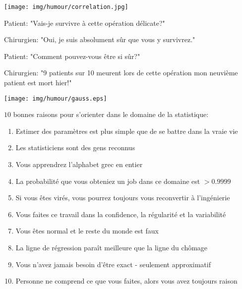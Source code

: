 \begin{center}\underline{\hspace{5 cm}}\end{center}

	\begin{center}
	\texttt{[image: img/humour/correlation.jpg]}
	\end{center}

\begin{center}\underline{\hspace{5 cm}}\end{center}

Patient: "Vais-je survivre à cette opération délicate?"

Chirurgien: "Oui, je suis absolument sûr que vous y survivrez."

Patient: "Comment pouvez-vous être si sûr?"

Chirurgien: "9 patients sur 10 meurent lors de cette opération mon neuvième patient est mort hier!"

\begin{center}\underline{\hspace{5 cm}}\end{center}

	\begin{center}
	\texttt{[image: img/humour/gauss.eps]}
	\end{center}

\pagebreak
$10$ bonnes raisons pour s'orienter dans le domaine de la statistique:
\begin{enumerate}
	\item Estimer des paramètres est plus simple que de se battre dans la vraie vie

	\item Les statisticiens sont des gens reconnus

	\item Vous apprendrez l'alphabet grec en entier

	\item La probabilité que vous obteniez un job dans ce domaine est $> 0.9999$

	\item Si vous êtes virés, vous pourrez toujours vous reconvertir à l'ingénierie

	\item Vous faites ce travail dans la confidence, la régularité et la variabilité

	\item Vous êtes normal et le reste du monde est faux

	\item La ligne de régression paraît meilleure que la ligne du chômage

	\item Vous n'avez jamais besoin d'être exact - seulement approximatif

	\item Personne ne comprend ce que vous faites, alors vous avez toujours raison
\end{enumerate} 

